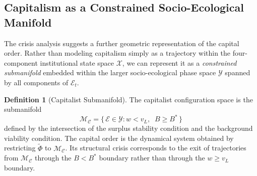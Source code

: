 \documentclass[12pt,a4paper]{article}
\theoremstyle{definition}
\newtheorem{definition}{Definition}[section]
\theoremstyle{remark}
\begin{document}
\subsection{Capitalism as a Constrained Socio-Ecological Manifold}

The crisis analysis suggests a further geometric representation of the capital order. Rather than modeling capitalism simply as a trajectory within the four-component institutional state space $\mathcal{X}$, we can represent it as a \emph{constrained submanifold} embedded within the larger socio-ecological phase space $\mathcal{Y}$ spanned by all components of $\mathcal{E}_t$.

\begin{definition}[Capitalist Submanifold]
The capitalist configuration space is the submanifold
\begin{equation}
  \mathcal{M}_{\mathcal{C}} = \bigl\{\, \mathcal{E} \in \mathcal{Y} : w < v_L,\;\; B \geq B^* \,\bigr\}
\end{equation}
defined by the intersection of the surplus stability condition and the background viability condition. The capital order is the dynamical system obtained by restricting $\tilde\Phi$ to $\mathcal{M}_{\mathcal{C}}$. Its structural crisis corresponds to the exit of trajectories from $\mathcal{M}_{\mathcal{C}}$ through the $B < B^*$ boundary rather than through the $w \geq v_L$ boundary.
\end{definition}
\end{document}
